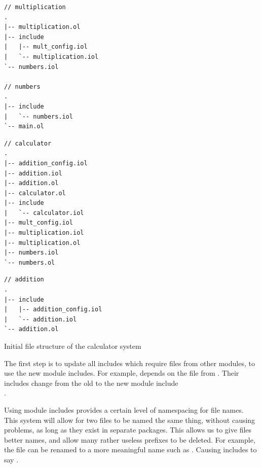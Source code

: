 \begin{listing}[H]

\begin{multicols}{3}

\begin{verbatim}
// multiplication
.
|-- multiplication.ol
|-- include
|   |-- mult_config.iol
|   `-- multiplication.iol
`-- numbers.iol

// numbers
.
|-- include
|   `-- numbers.iol
`-- main.ol
\end{verbatim}

\columnbreak

\begin{verbatim}
// calculator
.
|-- addition_config.iol
|-- addition.iol
|-- addition.ol
|-- calculator.ol
|-- include
|   `-- calculator.iol
|-- mult_config.iol
|-- multiplication.iol
|-- multiplication.ol
|-- numbers.iol
`-- numbers.ol
\end{verbatim}

\columnbreak

\begin{verbatim}
// addition
.
|-- include
|   |-- addition_config.iol
|   `-- addition.iol
`-- addition.ol
\end{verbatim}

\end{multicols}

\caption{Initial file structure of the calculator system}
\label{lst:start_file_structure}
\end{listing}

The first step is to update all includes which require files from other
modules, to use the new module includes. For example, 
depends on the file  from .  Their includes
change from the old  to the new module include
\\.

Using module includes provides a certain level of namespacing for file
names. This system will allow for two files to be named the same thing, without
causing problems, as long as they exist in separate packages. This allows us to
give files better names, and allow many rather useless prefixes to be deleted.
For example, the file  can be renamed to a more meaningful
name such as . Causing includes to say .

